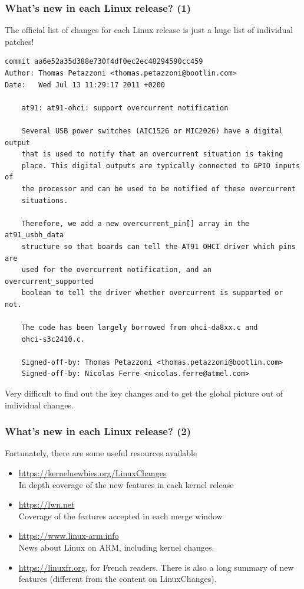 \begin{frame}[fragile]
  \frametitle{What's new in each Linux release? (1)}
  The official list of changes for each Linux release is just a
  huge list of individual patches!
\Tiny
    \begin{verbatim}
commit aa6e52a35d388e730f4df0ec2ec48294590cc459
Author: Thomas Petazzoni <thomas.petazzoni@bootlin.com>
Date:   Wed Jul 13 11:29:17 2011 +0200

    at91: at91-ohci: support overcurrent notification

    Several USB power switches (AIC1526 or MIC2026) have a digital output
    that is used to notify that an overcurrent situation is taking
    place. This digital outputs are typically connected to GPIO inputs of
    the processor and can be used to be notified of these overcurrent
    situations.

    Therefore, we add a new overcurrent_pin[] array in the at91_usbh_data
    structure so that boards can tell the AT91 OHCI driver which pins are
    used for the overcurrent notification, and an overcurrent_supported
    boolean to tell the driver whether overcurrent is supported or not.

    The code has been largely borrowed from ohci-da8xx.c and
    ohci-s3c2410.c.

    Signed-off-by: Thomas Petazzoni <thomas.petazzoni@bootlin.com>
    Signed-off-by: Nicolas Ferre <nicolas.ferre@atmel.com>
\end{verbatim}
\normalsize
  Very difficult to find out the key changes and to get the
  global picture out of individual changes.
\end{frame}

\begin{frame}
  \frametitle{What's new in each Linux release? (2)}
  Fortunately, there are some useful resources available
  \begin{itemize}
    \item \url{https://kernelnewbies.org/LinuxChanges}\\
	In depth coverage of the new features in each kernel release
    \item \url{https://lwn.net}\\
	Coverage of the features accepted in each merge window
    \item \url{https://www.linux-arm.info}\\
	News about Linux on ARM, including kernel changes.
    \item \url{https://linuxfr.org}, for French readers.
	There is also a long summary of new features (different
	from the content on LinuxChanges).
  \end{itemize}
\end{frame}
